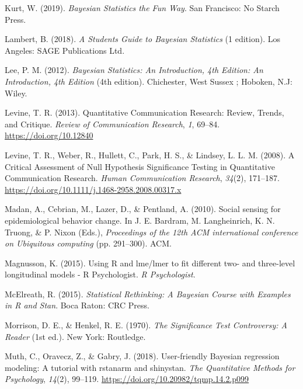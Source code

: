 \documentclass[
  english,
  doc]{apa6}
\newlength{\cslhangindent}
\newenvironment{cslreferences}%
  {\setlength{\parindent}{0pt}%
  \everypar{\setlength{\hangindent}{\cslhangindent}}\ignorespaces}%
  {\par}
\begin{document}
\begin{cslreferences}
\leavevmode\hypertarget{ref-kurtBayesianStatisticsFun2019}{}%
Kurt, W. (2019). \emph{Bayesian Statistics the Fun Way}. San Francisco: No Starch Press.

\leavevmode\hypertarget{ref-lambertStudentsGuideBayesian2018}{}%
Lambert, B. (2018). \emph{A Students Guide to Bayesian Statistics} (1 edition). Los Angeles: SAGE Publications Ltd.

\leavevmode\hypertarget{ref-leeBayesianStatisticsIntroduction2012}{}%
Lee, P. M. (2012). \emph{Bayesian Statistics: An Introduction, 4th Edition: An Introduction, 4th Edition} (4th edition). Chichester, West Sussex ; Hoboken, N.J: Wiley.

\leavevmode\hypertarget{ref-LevineQuantitativeCommunicationResearch2013}{}%
Levine, T. R. (2013). Quantitative Communication Research: Review, Trends, and Critique. \emph{Review of Communication Research}, \emph{1}, 69--84. \url{https://doi.org/10.12840}

\leavevmode\hypertarget{ref-LevineCriticalAssessmentNull2008}{}%
Levine, T. R., Weber, R., Hullett, C., Park, H. S., \& Lindsey, L. L. M. (2008). A Critical Assessment of Null Hypothesis Significance Testing in Quantitative Communication Research. \emph{Human Communication Research}, \emph{34}(2), 171--187. \url{https://doi.org/10.1111/j.1468-2958.2008.00317.x}

\leavevmode\hypertarget{ref-MadanSocialsensingepidemiological2010}{}%
Madan, A., Cebrian, M., Lazer, D., \& Pentland, A. (2010). Social sensing for epidemiological behavior change. In J. E. Bardram, M. Langheinrich, K. N. Truong, \& P. Nixon (Eds.), \emph{Proceedings of the 12th ACM international conference on Ubiquitous computing} (pp. 291--300). ACM.

\leavevmode\hypertarget{ref-magnussonUsingLmeLmer2015}{}%
Magnusson, K. (2015). Using R and lme/lmer to fit different two- and three-level longitudinal models - R Psychologist. \emph{R Psychologist}.

\leavevmode\hypertarget{ref-McElreathStatisticalRethinkingBayesian2015}{}%
McElreath, R. (2015). \emph{Statistical Rethinking: A Bayesian Course with Examples in R and Stan}. Boca Raton: CRC Press.

\leavevmode\hypertarget{ref-morrisonSignificanceTestControversy1970}{}%
Morrison, D. E., \& Henkel, R. E. (1970). \emph{The Significance Test Controversy: A Reader} (1st ed.). New York: Routledge.

\leavevmode\hypertarget{ref-TQMP14-2-99}{}%
Muth, C., Oravecz, Z., \& Gabry, J. (2018). User-friendly Bayesian regression modeling: A tutorial with rstanarm and shinystan. \emph{The Quantitative Methods for Psychology}, \emph{14}(2), 99--119. \url{https://doi.org/10.20982/tqmp.14.2.p099}


\end{cslreferences}
\end{document}
